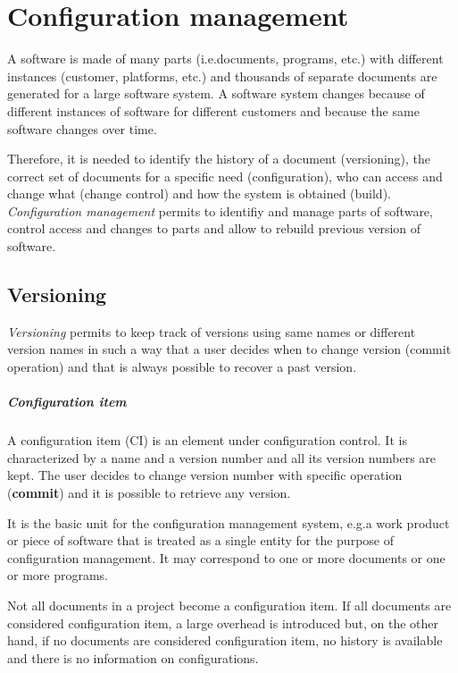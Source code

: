 \chapter{Configuration management}
A software is made of many parts (i.e.\@ documents, programs, etc.) with different instances (customer, platforms, etc.) and thousands of separate documents are generated for a large software system. A software system changes because of different instances of software for different customers and because the same software changes over time.

Therefore, it is needed to identify the history of a document (versioning), the correct set of documents for a specific need (configuration), who can access and change what (change control) and how the system is obtained (build). \emph{Configuration management} permits to identifiy and manage parts of software, control access and changes to parts and allow to rebuild previous version of software.

\section{Versioning}
\emph{Versioning} permits to keep track of versions using same names or different version names in such a way that a user decides when to change version (commit operation) and that is always possible to recover a past version.

\paragraph{Configuration item}
A configuration item (CI) is an element under configuration control. It is characterized by a name and a version number and all its version numbers are kept. The user decides to change version number with specific operation (\textbf{commit}) and it is possible to retrieve any version.

It is the basic unit for the configuration management system, e.g.\@ a work product or piece of software that is treated as a single entity for the purpose of configuration management. It may correspond to one or more documents or one or more programs.

Not all documents in a project become a configuration item. If all documents are considered configuration item, a large overhead is introduced but, on the other hand, if no documents are considered configuration item, no history is available and there is no information on configurations.

